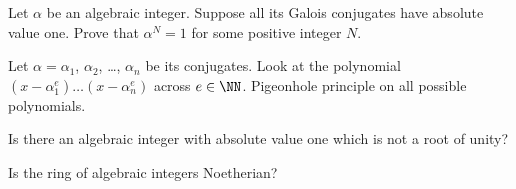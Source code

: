 \begin{problem}
	\yod
	Let $\alpha$ be an algebraic integer.
	Suppose all its Galois conjugates have absolute value one.
	Prove that $\alpha^N=1$ for some positive integer $N$.
	\begin{hint}
		Let $\alpha = \alpha_1$, $\alpha_2$, \dots, $\alpha_n$ be its conjugates.
		Look at the polynomial $(x-\alpha_1^e) \dots (x-\alpha_n^e)$ across $e \in \NN$.
		Pigeonhole principle on all possible polynomials.
	\end{hint}
\end{problem}

\begin{problem}
	\yod
	Is there an algebraic integer with absolute value one
	which is not a root of unity?
\end{problem}

\begin{problem}
	Is the ring of algebraic integers Noetherian?
\end{problem}
